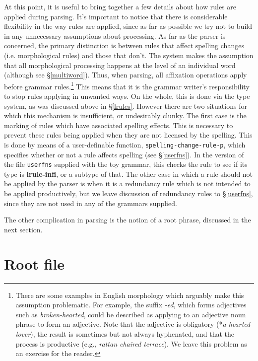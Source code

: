 \documentclass[12pt]{report}
\begin{document}
At this point, it is useful to bring together a few details
about how rules are applied during parsing.
It's important to notice that there is
considerable flexibility in the way rules are applied, 
since as far as possible
we try not to build in any unnecessary assumptions about processing.  
As far as
the parser is concerned, the primary distinction is between rules that affect
spelling changes (i.e. morphological rules) and those that don't.  The system
makes the assumption that all morphological processing happens at the level of
an individual word (although see \S\ref{multiword}).  Thus, when parsing, all
affixation operations apply before grammar rules.\footnote{There are some
examples in English morphology which arguably make this assumption problematic.
For example, the suffix {\it -ed}, which forms adjectives such as {\it
broken-hearted}, could be described as applying to an adjective noun phrase to
form an adjective.  Note that the adjective is obligatory (*{\it a hearted
lover}), the result is sometimes but not always hyphenated, and that the
process is productive (e.g., {\it rattan chaired terrace}).  We leave this
problem as an exercise for the reader.}
This means that it is the grammar writer's responsibility to
stop rules applying in unwanted ways.  On the whole, this is done
via the type system, as was discussed above in \S\ref{lrules}.
However there are two situations for which this mechanism 
is insufficient, or undesirably clunky.
The first case is the marking of rules which have associated spelling 
effects.  This is necessary to prevent these rules being applied
when they are not licensed by the spelling.  This is done by means
of a user-definable function, {\tt spelling-change-rule-p},
which specifies whether or not a rule
affects spelling (see \S\ref{userfns}).  In the 
version of the file {\tt userfns} supplied with the toy grammar,
this checks the rule to see if its type is {\bf lrule-infl}, or
a subtype of that.
The other case in which a rule should not be applied by the 
parser is when it is a redundancy rule which
is not intended to be applied productively, but we leave discussion of
redundancy rules 
to \S\ref{userfns}, since they are not used in any of the grammars
supplied.

The other complication in parsing is the notion of a root phrase,
discussed in the next section.


\section{Root file}
\label{root}
\end{document}
